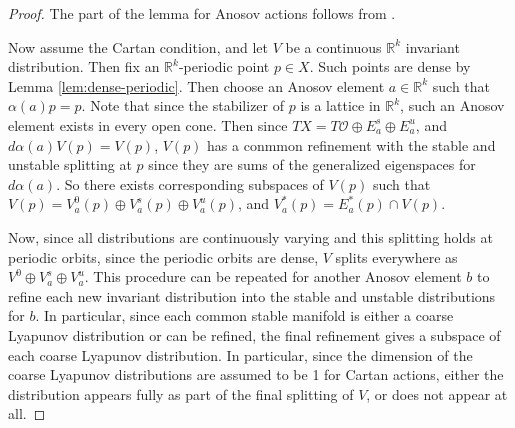 \documentclass[12pt]{amsart}
\theoremstyle{definition}
\theoremstyle{remark}
\numberwithin{equation}{section}
\newcommand{\R}{\mathbb{R}}
\newcommand{\mc}{\mathcal}
\newtheorem{Structural Stability Theorem}[theorem]{Structural Stability Theorem}
\begin{document}
\begin{proof}
The part of the lemma for Anosov actions follows from \cite[Corollary 4.6]{spatzier-vinhage}.

{ Now assume the Cartan condition,} and let $V$ be a {  continuous} $\R^k$ invariant distribution. Then fix { an $\R^k$-periodic} point $p \in X$. {  Such points are dense by Lemma \ref{lem:dense-periodic}.}%
Then choose %
 an Anosov element $a \in \R^k$ such that $\alpha(a) p = p$. {  Note that since the stabilizer of $p$ is a lattice in $\R^k$, such an Anosov element exists in every open cone}. %
 Then since $TX = T\mc O \oplus E^s_a \oplus E^u_a$, and $d\alpha(a)V(p) = V(p)$, $V(p)$ has a conmmon refinement with the stable and unstable splitting at $p$ since they are sums of the generalized eigenspaces for $d\alpha(a)$. So there exists corresponding subspaces of $V(p)$ such that $V(p) = V^0_a(p) \oplus V^s_a(p) \oplus V^u_a(p)$, and $V^*_a(p) = E^*_a(p) \cap V(p)$.

Now, since all distributions are continuously varying and this splitting holds at periodic orbits, since the periodic orbits are dense, $V$ splits everywhere as $V^0 \oplus V^s_a \oplus V^u_a$. This { procedure} can be repeated for another Anosov element $b$ to refine each new invariant distribution into the stable and unstable distributions for $b$. In particular, since each common stable manifold is either a coarse Lyapunov distribution or can be refined, the final refinement gives a subspace of each coarse Lyapunov distribution. In particular, since the dimension of the coarse Lyapunov distributions are assumed to be 1 for Cartan actions, either the distribution appears fully as part of the final splitting of $V$, or does not appear at all.
\end{proof}
\end{document}
